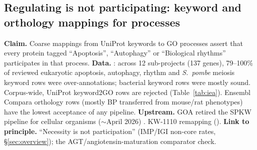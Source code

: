\subsection{Regulating is not participating: keyword and orthology mappings for processes}\label{sec:dd-kw}
\textbf{Claim.} Coarse mappings from UniProt keywords to GO processes assert that every protein
tagged ``Apoptosis'', ``Autophagy'' or ``Biological rhythms'' participates in that process.
\textbf{Data.} : across 12 sub-projects (137 genes), 79--100\% of reviewed
eukaryotic apoptosis, autophagy, rhythm and \textit{S.\ pombe} meiosis keyword rows were
over-annotations; bacterial keyword rows were mostly sound. Corpus-wide, UniProt keyword2GO rows
are  rejected (Table~\ref{tab:iea}). Ensembl Compara orthology rows (mostly BP
transferred from mouse/rat phenotypes) have the lowest acceptance of any pipeline.
\textbf{Upstream.} GOA retired the SPKW pipeline for cellular organisms ($\sim$April 2026)
. KW-1110 remapping ().
\textbf{Link to principle.} ``Necessity is not participation'' (IMP/IGI non-core rates,
\S\ref{sec:overview}); the AGT/angiotensin-maturation comparator check.
